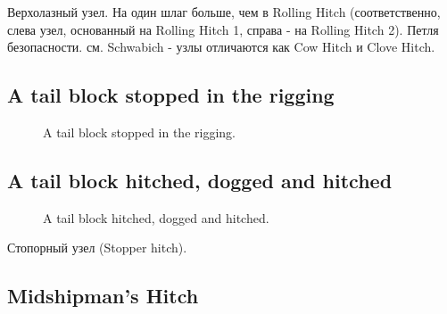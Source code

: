 Верхолазный узел. На один шлаг больше, чем в Rolling Hitch (соответственно, слева узел, основанный на Rolling Hitch 1, справа - на Rolling Hitch 2). Петля безопасности. см. Schwabich - узлы отличаются как Cow Hitch и Clove Hitch.

\subsection{A tail block stopped in the rigging}

\begin{figure}[H]\centering
\hfil
	\caption{A tail block stopped in the rigging.}\label{ris:A_tail_block_stopped_in_the_rigging}
\end{figure}

\subsection{A tail block hitched, dogged and hitched}

\begin{figure}[H]\centering
\end{figure}
\begin{figure}[H]\centering
	\caption{A tail block hitched, dogged and hitched.}\label{ris:A_tail_block_hitched_dogged_and_hitched}
\end{figure}

Стопорный узел (Stopper hitch).

\subsection{Midshipman’s Hitch}

